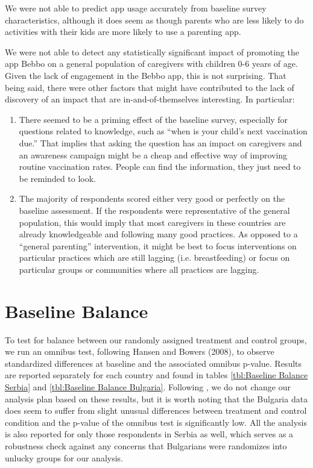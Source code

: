 \documentclass{article}
\begin{document}
We were not able to predict app usage accurately from baseline survey characteristics, although it does seem as though parents who are less likely to do activities with their kids are more likely to use a parenting app.

We were not able to detect any statistically significant impact of promoting the app Bebbo on a general population of caregivers with children 0-6 years of age. Given the lack of engagement in the Bebbo app, this is not surprising. That being said, there were other factors that might have contributed to the lack of discovery of an impact that are in-and-of-themselves interesting. In particular:

\begin{enumerate}
\item There seemed to be a priming effect of the baseline survey, especially for questions related to knowledge, such as ``when is your child's next vaccination due.'' That implies that asking the question has an impact on caregivers and an awareness campaign might be a cheap and effective way of improving routine vaccination rates. People can find the information, they just need to be reminded to look.
\item The majority of respondents scored either very good or perfectly on the baseline assessment. If the respondents were representative of the general population, this would imply that most caregivers in these countries are already knowledgeable and following many good practices. As opposed to a ``general parenting'' intervention, it might be best to focus interventions on particular practices which are still lagging (i.e. breastfeeding) or focus on particular groups or communities where all practices are lagging.
\end{enumerate}



\printbibliography

\appendix



\section{Baseline Balance}

To test for balance between our randomly assigned treatment and control groups, we run an omnibus test, following Hansen and Bowers (2008), to observe standardized differences at baseline and the associated omnibus p-value. Results are reported separately for each country and found in tables \ref{tbl:Baseline Balance Serbia} and \ref{tbl:Baseline Balance Bulgaria}. Following \cite{Altman2014}, we do not change our analysis plan based on these results, but it is worth noting that the Bulgaria data does seem to suffer from slight unusual differences between treatment and control condition and the p-value of the omnibus test is significantly low. All the analysis is also reported for only those respondents in Serbia as well, which serves as a robustness check against any concerns that Bulgarians were randomizes into unlucky groups for our analysis.
\end{document}

